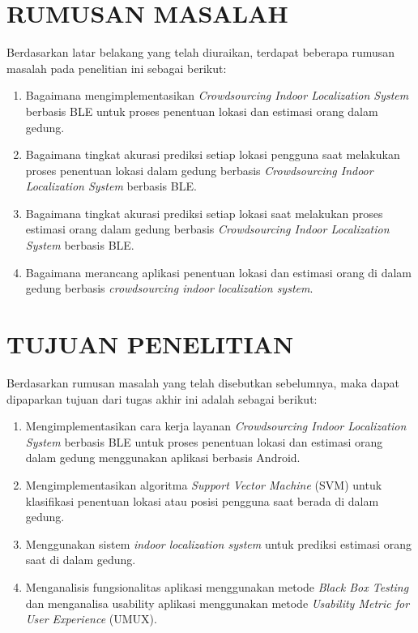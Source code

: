 \section{\uppercase{RUMUSAN MASALAH}}
Berdasarkan latar belakang yang telah diuraikan, terdapat beberapa rumusan masalah pada penelitian ini sebagai berikut:
\begin{enumerate}
	\item Bagaimana mengimplementasikan \textit{Crowdsourcing Indoor Localization System} berbasis BLE untuk proses penentuan lokasi dan estimasi orang dalam gedung.
	\item Bagaimana tingkat akurasi prediksi setiap lokasi pengguna saat melakukan proses  penentuan lokasi dalam gedung berbasis \textit{Crowdsourcing Indoor Localization System} berbasis BLE.
	\item Bagaimana tingkat akurasi prediksi setiap lokasi saat melakukan proses estimasi orang dalam gedung berbasis \textit{Crowdsourcing Indoor Localization System} berbasis BLE.
	\item Bagaimana merancang aplikasi penentuan lokasi dan estimasi orang di dalam gedung berbasis \textit{crowdsourcing indoor localization system}.

\end{enumerate}

\section{\uppercase{TUJUAN PENELITIAN}}
Berdasarkan rumusan masalah yang telah disebutkan sebelumnya, maka dapat dipaparkan tujuan dari tugas akhir ini adalah sebagai berikut:
\begin{enumerate}
	\item Mengimplementasikan cara kerja layanan \textit{Crowdsourcing Indoor Localization System} berbasis BLE untuk proses penentuan lokasi dan estimasi orang dalam gedung menggunakan aplikasi berbasis Android.
	\item Mengimplementasikan algoritma \textit{\textit{Support Vector Machine}} (SVM) untuk klasifikasi penentuan lokasi atau posisi pengguna saat berada  di dalam gedung.
	\item Menggunakan sistem \textit{indoor localization system} untuk prediksi estimasi orang saat di dalam gedung.
	\item Menganalisis fungsionalitas aplikasi menggunakan metode \textit{Black Box Testing} dan menganalisa usability aplikasi menggunakan metode \textit{Usability Metric for User Experience} (UMUX).
\end{enumerate}


